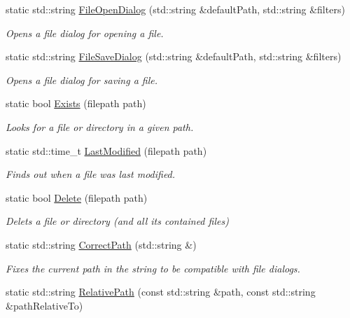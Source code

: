 \begin{DoxyCompactItemize}
\item 
static std\-::string \hyperlink{classDCEngine_1_1FileSystem_ab21e1879b3bd52feae5d9929e165d1c4}{File\-Open\-Dialog} (std\-::string \&default\-Path, std\-::string \&filters)
\begin{DoxyCompactList}\small\item\em Opens a file dialog for opening a file. \end{DoxyCompactList}\item 
static std\-::string \hyperlink{classDCEngine_1_1FileSystem_a7c5c7794da2cf5dff25c500355cf5dd5}{File\-Save\-Dialog} (std\-::string \&default\-Path, std\-::string \&filters)
\begin{DoxyCompactList}\small\item\em Opens a file dialog for saving a file. \end{DoxyCompactList}\item 
static bool \hyperlink{classDCEngine_1_1FileSystem_ac386b00e864763ada216c12465297904}{Exists} (filepath path)
\begin{DoxyCompactList}\small\item\em Looks for a file or directory in a given path. \end{DoxyCompactList}\item 
static std\-::time\-\_\-t \hyperlink{classDCEngine_1_1FileSystem_a11614d41a464e2557768e5d4cce34cbf}{Last\-Modified} (filepath path)
\begin{DoxyCompactList}\small\item\em Finds out when a file was last modified. \end{DoxyCompactList}\item 
static bool \hyperlink{classDCEngine_1_1FileSystem_a9f968596a575c9c8f5470f61adc8f491}{Delete} (filepath path)
\begin{DoxyCompactList}\small\item\em Delets a file or directory (and all its contained files) \end{DoxyCompactList}\item 
static std\-::string \hyperlink{classDCEngine_1_1FileSystem_a90f21540e3505323b65c25df71fe8228}{Correct\-Path} (std\-::string \&)
\begin{DoxyCompactList}\small\item\em Fixes the current path in the string to be compatible with file dialogs. \end{DoxyCompactList}\item 
static std\-::string \hyperlink{classDCEngine_1_1FileSystem_a60005bd9d91bc2b01b3ff25fa8d15c84}{Relative\-Path} (const std\-::string \&path, const std\-::string \&path\-Relative\-To)

\end{DoxyCompactItemize}
